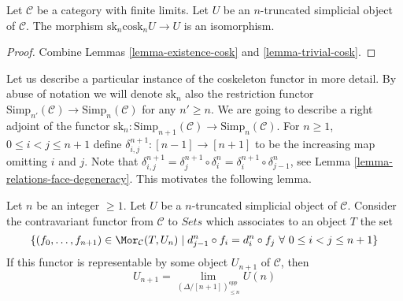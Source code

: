 \begin{lemma}
\label{lemma-recover-cosk}
Let $\mathcal{C}$ be a category with finite limits.
Let $U$ be an $n$-truncated simplicial object of $\mathcal{C}$.
The morphism $\text{sk}_n \text{cosk}_n U \to U$
is an isomorphism.
\end{lemma}

\begin{proof}
Combine Lemmas \ref{lemma-existence-cosk} and \ref{lemma-trivial-cosk}.
\end{proof}

\noindent
Let us describe a particular instance of the coskeleton functor in more detail.
By abuse of notation we will denote $\text{sk}_n$
also the restriction functor
$\text{Simp}_{n'}(\mathcal{C}) \to \text{Simp}_n(\mathcal{C})$
for any $n' \geq n$. We are going to describe a right adjoint
of the functor
$\text{sk}_n : \text{Simp}_{n + 1}(\mathcal{C})
\to \text{Simp}_n(\mathcal{C})$.
For $n \geq 1$, $0 \leq i < j \leq n + 1$
define $\delta^{n + 1}_{i, j} : [n - 1] \to [n + 1]$
to be the increasing map omitting $i$ and $j$.
Note that
$\delta^{n + 1}_{i, j} =
\delta^{n + 1}_j \circ \delta^n_i =
\delta^{n + 1}_i \circ \delta^n_{j - 1}$, see
Lemma \ref{lemma-relations-face-degeneracy}. This motivates
the following lemma.

\begin{lemma}
\label{lemma-formula-limit}
Let $n$ be an integer $\geq 1$.
Let $U$ be a $n$-truncated simplicial object of $\mathcal{C}$.
Consider the contravariant functor from $\mathcal{C}$ to
$\textit{Sets}$ which associates to an object $T$ the set
$$
\{ (f_0, \ldots, f_{n + 1}) \in \Mor_\mathcal{C}(T, U_n)
\mid
d^n_{j - 1} \circ f_i = d^n_i \circ f_j
\ \forall\ 0\leq i < j\leq n + 1\}
$$
If this functor is representable by some object $U_{n + 1}$
of $\mathcal{C}$, then
$$
U_{n + 1} = \lim_{(\Delta/[n + 1])_{\leq n}^{opp}} U(n)
$$
\end{lemma}

